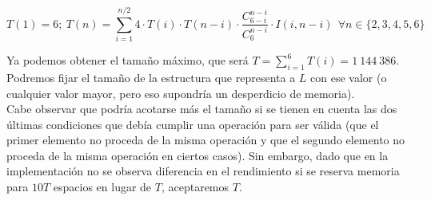 $$T(1) = 6;\ T(n) = \sum_{i=1}^{n/2} 4 \cdot T(i) \cdot T(n-i) \cdot \frac {C_{6-i}^{n-i}} {C_6^{n-i}} \cdot I(i,n-i) \ \ \forall n \in \{2,3,4,5,6\}$$

Ya podemos obtener el tamaño máximo, que será $\displaystyle T = \sum_{i=1}^6 T(i) = 1\ 144\ 386$. Podremos fijar el tamaño de la estructura que representa a $L$ con ese valor (o cualquier valor mayor, pero eso supondría un desperdicio de memoria). \\

Cabe observar que podría acotarse más el tamaño si se tienen en cuenta las dos últimas condiciones que debía cumplir una operación para ser válida (que el primer elemento no proceda de la misma operación y que el segundo elemento no proceda de la misma operación en ciertos casos). Sin embargo, dado que en la implementación no se observa diferencia en el rendimiento si se reserva memoria para $10T$ espacios en lugar de $T$, aceptaremos $T$.